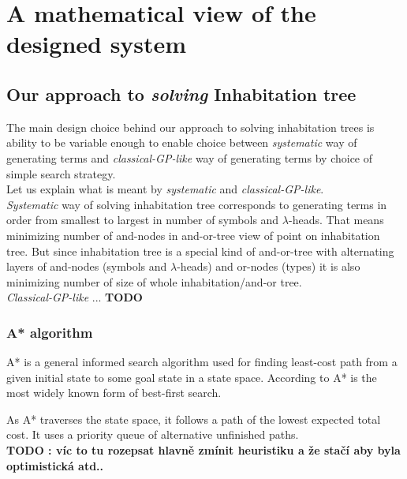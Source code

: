 \documentclass[12pt,a4paper]{report}
\newcommand{\Lets}{Let us\xspace}
\newcommand{\lheads}{$\lambda$-heads\xspace}
\begin{document}
\chapter{ A mathematical view of the designed system }	

\section{Our approach to \textit{solving} Inhabitation tree}


The main design choice behind our approach to solving inhabitation trees
is ability to be variable enough to enable choice between 
\textit{systematic} way of generating terms 
and \textit{classical-GP-like} way of generating terms 
by choice of simple search strategy.\\

\Lets explain what is meant by \textit{systematic} and \textit{classical-GP-like}. \\

\textit{Systematic} way of solving inhabitation tree corresponds to
generating terms in order from smallest to largest in number of symbols and \lheads.
That means minimizing number of and-nodes in and-or-tree view of point on inhabitation tree.
But since inhabitation tree is a special kind of and-or-tree with alternating layers of 
and-nodes (symbols and \lheads) and or-nodes (types) it is also minimizing number of 
size of whole inhabitation/and-or tree. \\

\textit{Classical-GP-like} ... \textbf{TODO}

\subsection{A* algorithm}

A* is a general informed search algorithm used for finding least-cost 
path from a given initial state to some goal state in a state space.
According to \cite{AIAMA} A* is the most widely known form of best-first search.

As A* traverses the state space, it follows a path of the lowest expected total cost.
It uses a priority queue of alternative unfinished paths.\\

\textbf{TODO : víc to tu rozepsat hlavně zmínit heuristiku 
a že stačí aby byla optimistická atd.. }
\end{document}
